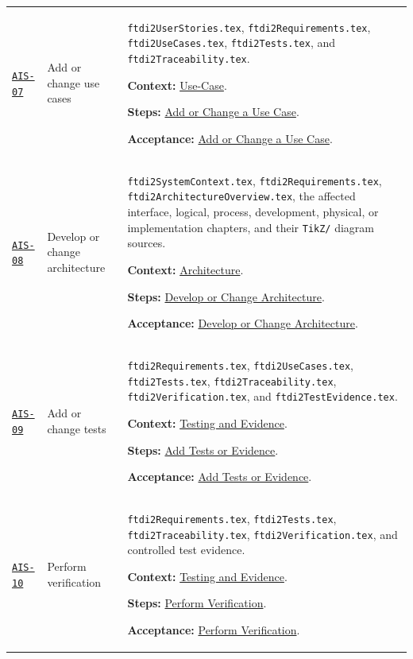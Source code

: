 \begin{tabularx}{\linewidth}{L{1.6cm}L{3.1cm}Y}
\label{Skill:AIS-07}\hyperref[Section:AIUseCaseSteps]{\texttt{AIS-07}} & Add or change use cases & \texttt{ftdi2UserStories.tex}, \texttt{ftdi2Requirements.tex}, \texttt{ftdi2UseCases.tex}, \texttt{ftdi2Tests.tex}, and \texttt{ftdi2Traceability.tex}.\par\textbf{Context:} \hyperref[Section:AIUseCaseContext]{Use-Case}.\par\textbf{Steps:} \hyperref[Section:AIUseCaseTaskSteps]{Add or Change a Use Case}.\par\textbf{Acceptance:} \hyperref[Section:AIUseCaseAcceptance]{Add or Change a Use Case}.\\
\label{Skill:AIS-08}\hyperref[Section:AIArchitectureSteps]{\texttt{AIS-08}} & Develop or change architecture & \texttt{ftdi2SystemContext.tex}, \texttt{ftdi2Requirements.tex}, \texttt{ftdi2ArchitectureOverview.tex}, the affected interface, logical, process, development, physical, or implementation chapters, and their \texttt{TikZ/} diagram sources.\par\textbf{Context:} \hyperref[Section:AIArchitectureContext]{Architecture}.\par\textbf{Steps:} \hyperref[Section:AIArchitectureTaskSteps]{Develop or Change Architecture}.\par\textbf{Acceptance:} \hyperref[Section:AIArchitectureAcceptance]{Develop or Change Architecture}.\\
\label{Skill:AIS-09}\hyperref[Section:AITestSteps]{\texttt{AIS-09}} & Add or change tests & \texttt{ftdi2Requirements.tex}, \texttt{ftdi2UseCases.tex}, \texttt{ftdi2Tests.tex}, \texttt{ftdi2Traceability.tex}, \texttt{ftdi2Verification.tex}, and \texttt{ftdi2TestEvidence.tex}.\par\textbf{Context:} \hyperref[Section:AITestingContext]{Testing and Evidence}.\par\textbf{Steps:} \hyperref[Section:AITestTaskSteps]{Add Tests or Evidence}.\par\textbf{Acceptance:} \hyperref[Section:AITestAcceptance]{Add Tests or Evidence}.\\
\label{Skill:AIS-10}\hyperref[Section:AIVerificationSteps]{\texttt{AIS-10}} & Perform verification & \texttt{ftdi2Requirements.tex}, \texttt{ftdi2Tests.tex}, \texttt{ftdi2Traceability.tex}, \texttt{ftdi2Verification.tex}, and controlled test evidence.\par\textbf{Context:} \hyperref[Section:AITestingContext]{Testing and Evidence}.\par\textbf{Steps:} \hyperref[Section:AIVerificationTaskSteps]{Perform Verification}.\par\textbf{Acceptance:} \hyperref[Section:AIVerificationAcceptance]{Perform Verification}.\\

\end{tabularx}
